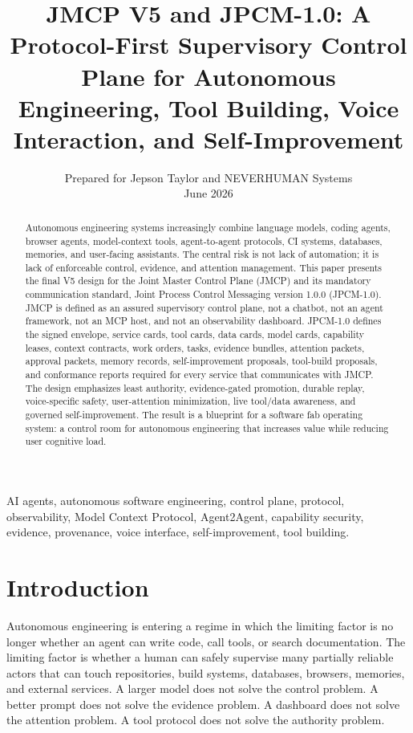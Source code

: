 \documentclass[10pt,journal,onecolumn]{IEEEtran}
\title{JMCP V5 and JPCM-1.0: A Protocol-First Supervisory Control Plane for Autonomous Engineering, Tool Building, Voice Interaction, and Self-Improvement}
\author{Prepared for Jepson Taylor and NEVERHUMAN Systems\\June 2026}
\begin{document}
\maketitle
\begin{abstract}
Autonomous engineering systems increasingly combine language models, coding agents, browser agents, model-context tools, agent-to-agent protocols, CI systems, databases, memories, and user-facing assistants. The central risk is not lack of automation; it is lack of enforceable control, evidence, and attention management. This paper presents the final V5 design for the Joint Master Control Plane (JMCP) and its mandatory communication standard, Joint Process Control Messaging version 1.0.0 (JPCM-1.0). JMCP is defined as an assured supervisory control plane, not a chatbot, not an agent framework, not an MCP host, and not an observability dashboard. JPCM-1.0 defines the signed envelope, service cards, tool cards, data cards, model cards, capability leases, context contracts, work orders, tasks, evidence bundles, attention packets, approval packets, memory records, self-improvement proposals, tool-build proposals, and conformance reports required for every service that communicates with JMCP. The design emphasizes least authority, evidence-gated promotion, durable replay, voice-specific safety, user-attention minimization, live tool/data awareness, and governed self-improvement. The result is a blueprint for a software fab operating system: a control room for autonomous engineering that increases value while reducing user cognitive load.
\end{abstract}
\begin{IEEEkeywords}
AI agents, autonomous software engineering, control plane, protocol, observability, Model Context Protocol, Agent2Agent, capability security, evidence, provenance, voice interface, self-improvement, tool building.
\end{IEEEkeywords}

\section{Introduction}
Autonomous engineering is entering a regime in which the limiting factor is no longer whether an agent can write code, call tools, or search documentation. The limiting factor is whether a human can safely supervise many partially reliable actors that can touch repositories, build systems, databases, browsers, memories, and external services. A larger model does not solve the control problem. A better prompt does not solve the evidence problem. A dashboard does not solve the attention problem. A tool protocol does not solve the authority problem.
\end{document}
